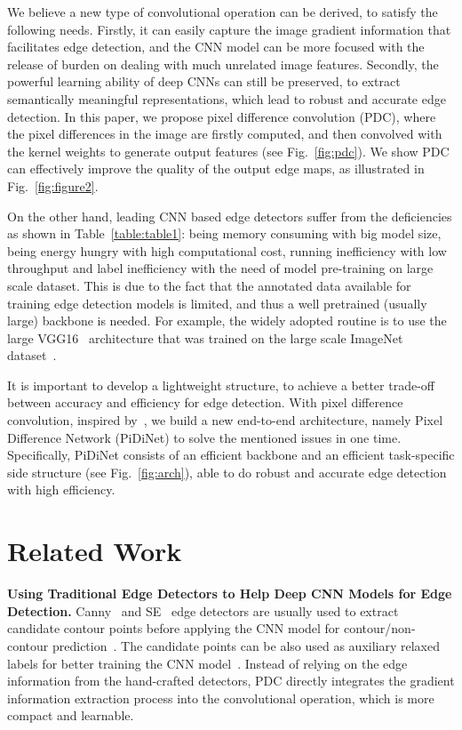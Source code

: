 \documentclass[10pt,twocolumn,letterpaper]{article}
\begin{document}
We believe a new type of convolutional operation can be derived, to satisfy the following needs. Firstly, it can easily capture the image gradient information that facilitates edge detection, and the CNN model can be more focused with the release of burden on dealing with much unrelated image features. Secondly, the powerful learning ability of deep CNNs can still be preserved, to extract semantically meaningful representations, which lead to robust and accurate edge detection. In this paper, we propose pixel difference convolution (PDC), where the pixel differences in the image are firstly computed, and then convolved with the kernel weights to generate output features (see Fig.~\ref{fig:pdc}). We show PDC can effectively improve the quality of the output edge maps, as illustrated in Fig.~\ref{fig:figure2}. 

On the other hand, leading CNN based edge detectors suffer from the deficiencies as shown in Table~\ref{table:table1}: being memory consuming with big model size, being energy hungry with high computational cost, running inefficiency with low throughput and label inefficiency with the need of model pre-training on large scale dataset. This is due to the fact that the annotated data available for training edge detection models is limited, and thus a well pretrained (usually large) backbone is needed. For example, the widely adopted routine is to use the large VGG16~\cite{simonyan2014very} architecture that was trained on the large scale ImageNet dataset~\cite{deng2009imagenet}. 

It is important to develop a lightweight structure, to achieve a better trade-off between accuracy and efficiency for edge detection. With pixel difference convolution, inspired by~\cite{he2016residual,howard2017mobilenets}, we build a new end-to-end architecture, namely Pixel Difference Network (PiDiNet) to solve the mentioned issues in one time. Specifically, PiDiNet consists of an efficient backbone and an efficient task-specific side structure (see Fig.~\ref{fig:arch}), able to do robust and accurate edge detection with high efficiency.


\section{Related Work}


\noindent \textbf{Using Traditional Edge Detectors to Help Deep CNN Models for Edge Detection.} \quad Canny~\cite{canny1986computational} and SE~\cite{dollar2014se} edge detectors are usually used to extract candidate contour points before applying the CNN model for contour/non-contour prediction~\cite{bertasius2015deepedge, bertasius2015hfl}. The candidate points can be also used as auxiliary relaxed labels for better training the CNN model~\cite{liu2016relaxed}. Instead of relying on the edge information from the hand-crafted detectors, PDC directly integrates the gradient information extraction process into the convolutional operation, which is more compact and learnable.
\end{document}
